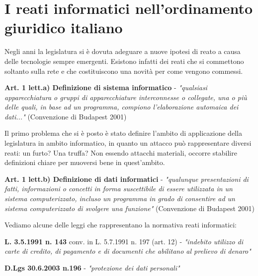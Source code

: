 \chapter{I reati informatici nell'ordinamento giuridico italiano}

Negli anni la legislatura si è dovuta adeguare a nuove ipotesi di reato a causa delle tecnologie sempre emergenti. Esistono infatti dei reati che si commettono soltanto sulla rete e che costituiscono una novità per come vengono commessi.  
 
\vspace{5mm}
 
\textbf{Art. 1 lett.a) Definizione di sistema informatico} -  \textit{"qualsiasi apparecchiatura o gruppi di apparecchiature interconnesse o collegate, una o più delle quali, in base ad un programma, compiono l'elaborazione automaica dei dati..."} (Convenzione di Budapest 2001)
 
\vspace{5mm}
 
Il primo problema che si è posto è stato definire l'ambito di applicazione della legislatura in ambito informatico, in quanto un attacco può rappresentare diversi reati: un furto? Una truffa? Non essendo attacchi materiali, occorre stabilire definizioni chiare per muoversi bene in quest'ambito. 

\vspace{5mm}

\textbf{Art. 1 lett.b) Definizione di dati informatici} - \textit{"qualunque presentazioni di fatti, informazioni o concetti in forma suscettibile di essere utilizzata in un sistema computerizzato, incluso un programma in grado di consentire ad un sistema computerizzato di svolgere una funzione"} (Convenzione di Budapest 2001)

\vspace{5mm}

Vediamo alcune delle leggi che rappresentano la normativa reati informatici:

\vspace{5mm}

\textbf{L. 3.5.1991 n. 143} conv. in L. 5.7.1991 n. 197 (art. 12) - \textit{"indebito utilizzo di carte di credito, di pagamento e di documenti che abilitano al prelievo di denaro"}

\vspace{5mm}

\textbf{D.Lgs 30.6.2003 n.196} - \textit{"protezione dei dati personali"}

